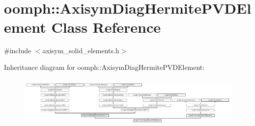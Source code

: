 \hypertarget{classoomph_1_1AxisymDiagHermitePVDElement}{}\section{oomph\+:\+:Axisym\+Diag\+Hermite\+P\+V\+D\+Element Class Reference}
\label{classoomph_1_1AxisymDiagHermitePVDElement}


{\ttfamily \#include $<$axisym\+\_\+solid\+\_\+elements.\+h$>$}

Inheritance diagram for oomph\+:\+:Axisym\+Diag\+Hermite\+P\+V\+D\+Element\+:\begin{figure}[H]
\begin{center}
\leavevmode
\includegraphics[height=2.612245cm]{classoomph_1_1AxisymDiagHermitePVDElement}
\end{center}
\end{figure}
